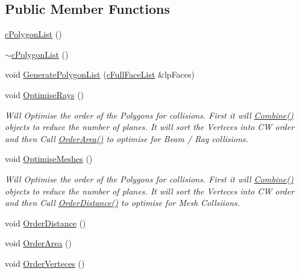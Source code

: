 \subsection*{Public Member Functions}
\begin{DoxyCompactItemize}
\item 
\hyperlink{classc_polygon_list_a5b25d94df3f23aa62a142f554a00131d}{cPolygonList} ()
\item 
\hyperlink{classc_polygon_list_aa088f845f366651dcc31282b92c3d94d}{$\sim$cPolygonList} ()
\item 
void \hyperlink{classc_polygon_list_aee102d8feb7c36a8bead496f1d16678c}{GeneratePolygonList} (\hyperlink{classc_full_face_list}{cFullFaceList} \&lpFaces)
\item 
void \hyperlink{classc_polygon_list_a91cd1f95d714e3c2fbdac38d3cfc76df}{OptimiseRays} ()
\begin{DoxyCompactList}\small\item\em Will Optimise the order of the Polygons for collisions. First it will \hyperlink{classc_polygon_list_a00ec90ea8f6e2850bf58d582032f34cf}{Combine()} objects to reduce the number of planes. It will sort the Verteces into CW order and then Call \hyperlink{classc_polygon_list_ab5fdfa559211464c3b1627c91515679b}{OrderArea()} to optimise for Beam / Ray collisions. \item\end{DoxyCompactList}\item 
void \hyperlink{classc_polygon_list_a3c6b265a4d2071846aad8a2cdb284152}{OptimiseMeshes} ()
\begin{DoxyCompactList}\small\item\em Will Optimise the order of the Polygons for collisions. First it will \hyperlink{classc_polygon_list_a00ec90ea8f6e2850bf58d582032f34cf}{Combine()} objects to reduce the number of planes. It will sort the Verteces into CW order and then Call \hyperlink{classc_polygon_list_a2f4430692e4a4c7bf3b074581d078900}{OrderDistance()} to optimise for Mesh Collsiions. \item\end{DoxyCompactList}\item 
void \hyperlink{classc_polygon_list_a2f4430692e4a4c7bf3b074581d078900}{OrderDistance} ()
\item 
void \hyperlink{classc_polygon_list_ab5fdfa559211464c3b1627c91515679b}{OrderArea} ()
\item 
void \hyperlink{classc_polygon_list_a26d7b4b90f532c19f2bf3b8c72e845b5}{OrderVerteces} ()
\item 

\end{DoxyCompactItemize}

